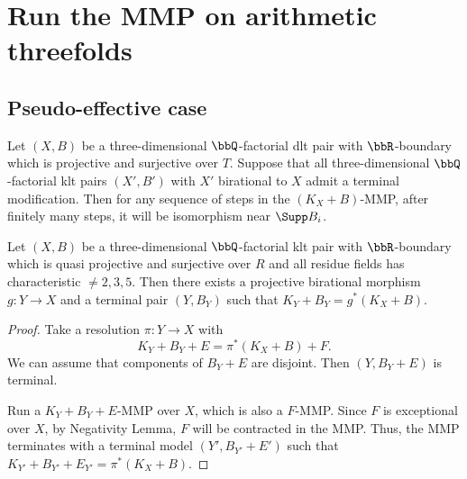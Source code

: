 \section{Run the MMP on arithmetic threefolds}


\subsection{Pseudo-effective case}

    \begin{lemma}[Theorem 9.8]\label{lem:pe_terminal_modification_imply_special_termination}
        Let \((X,B)\) be a three-dimensional \(\bbQ\)-factorial dlt pair with \(\bbR\)-boundary which is projective and surjective over \(T\).
        Suppose that all three-dimensional \(\bbQ\)-factorial klt pairs \((X',B')\) with \(X'\) birational to \(X\) admit a terminal modification.
        Then for any sequence of steps in the \((K_X + B)\)-MMP, after finitely many steps, it will be isomorphism near \(\Supp B_i\).
    \end{lemma}

    \begin{lemma}\label{lem:terminal_modification}
        Let \((X,B)\) be a three-dimensional \(\bbQ\)-factorial klt pair with \(\bbR\)-boundary which is quasi projective and surjective over \(R\) and all residue fields has characteristic \(\neq 2,3,5\).
        Then there exists a projective birational morphism \(g:Y \to X\) and a terminal pair \((Y,B_Y)\) such that \(K_Y + B_Y = g^*(K_X + B)\).
    \end{lemma}
    \begin{proof}
        Take a resolution \(\pi:Y \to X\) with 
        \[ K_Y + B_Y + E = \pi^*(K_X + B) + F.\]
        We can assume that components of \(B_Y+E\) are disjoint.
        Then \((Y,B_Y + E)\) is terminal.

        Run a \(K_Y + B_Y + E\)-MMP over \(X\), which is also a \(F\)-MMP.
        Since \(F\) is exceptional over \(X\), by Negativity Lemma, \(F\) will be contracted in the MMP.
        Thus, the MMP terminates with a terminal model \((Y',B_{Y'}+E')\) such that \(K_{Y'} + B_{Y'} + E_{Y'} = \pi^*(K_X + B)\).
    \end{proof}

